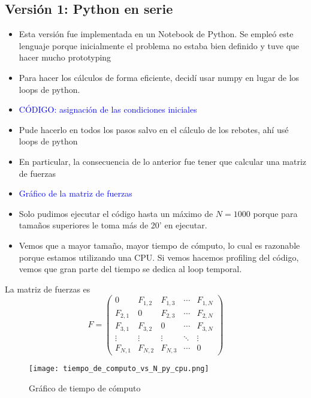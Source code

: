 \documentclass[aps,prb,twocolumn,superscriptaddress,floatfix,longbibliography]{revtex4-2}
\newcounter{para}
\begin{document}
\begin{itemize}
\subsection{Versión 1: Python en serie}

\begin{itemize}
    \item Esta versión fue implementada en un Notebook de Python. Se empleó este lenguaje porque inicialmente el problema no estaba bien definido y tuve que hacer mucho prototyping
    \item Para hacer los cálculos de forma eficiente, decidí usar numpy en lugar de los loops de python.
    \item \textcolor{blue}{CÓDIGO: asignación de las condiciones iniciales}
    \item Pude hacerlo en todos los pasos salvo en el cálculo de los rebotes, ahí usé loops de python
    \item En particular, la consecuencia de lo anterior fue tener que calcular una matriz de fuerzas
    \item \textcolor{blue}{Gráfico de la matriz de fuerzas}
    \item Solo pudimos ejecutar el código hasta un máximo de $N = 1000$ porque para tamaños superiores le toma más de 20' en ejecutar.
    \item Vemos que a mayor tamaño, mayor tiempo de cómputo, lo cual es razonable porque estamos utilizando una CPU. Si vemos hacemos profiling del código, vemos que gran parte del tiempo se dedica al loop temporal.
\end{itemize}

La matriz de fuerzas es
\[
F = \begin{pmatrix}
    0 & F_{1,2} & F_{1,3} & \cdots & F_{1,N} \\
    F_{2,1} & 0 & F_{2,3} & \cdots & F_{2,N} \\
    F_{3,1} & F_{3,2} & 0 & \cdots & F_{3,N} \\
    \vdots  & \vdots  & \vdots  & \ddots & \vdots  \\
    F_{N,1} & F_{N,2} & F_{N,3} & \cdots & 0
\end{pmatrix}
\]

\begin{figure}[h]
    \texttt{[image: tiempo\_de\_computo\_vs\_N\_py\_cpu.png]}
    \caption{Gráfico de tiempo de cómputo}
     \label{fig:tiempo_de_computo_vs_N_py_cpu}
\end{figure}


\end{itemize}
\end{document}
